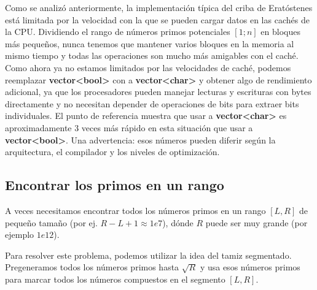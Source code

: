 Como se analizó anteriormente, la implementación típica del criba de Eratóstenes está limitada por la velocidad con la que se pueden cargar datos en las cachés de la CPU. Dividiendo el rango de números primos potenciales $[1; n]$ en bloques más pequeños, nunca tenemos que mantener varios bloques en la memoria al mismo tiempo y todas las operaciones son mucho más amigables con el caché. Como ahora ya no estamos limitados por las velocidades de caché, podemos reemplazar \textbf{vector<bool>} con a \textbf{vector<char>} y obtener algo de rendimiento adicional, ya que los procesadores pueden manejar lecturas y escrituras con bytes directamente y no necesitan depender de operaciones de bits para extraer bits individuales. El punto de referencia muestra que usar a \textbf{vector<char>} es aproximadamente 3 veces más rápido en esta situación que usar a \textbf{vector<bool>}. Una advertencia: esos números pueden diferir según la arquitectura, el compilador y los niveles de optimización.

\subsection{Encontrar los primos en un rango}

A veces necesitamos encontrar todos los números primos en un rango $[L,R]$ de pequeño tamaño (por ej. $R-L+1 \approx 1e7$), dónde $R$ puede ser muy grande (por ejemplo $1e12$).

Para resolver este problema, podemos utilizar la idea del tamiz segmentado. Pregeneramos todos los números primos hasta $\sqrt R$ y usa esos números primos para marcar todos los números compuestos en el segmento $[L, R]$.